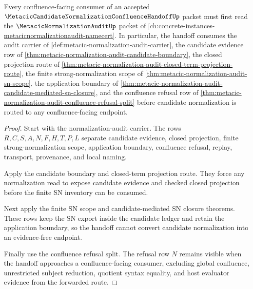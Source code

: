 \begin{theorem}
\label{thm:metacic-candidate-normalization-confluence-handoff-normalization-audit-forward-link}
Every confluence-facing consumer of an accepted $\MetacicCandidateNormalizationConfluenceHandoffUp$ packet must first read the $\MetacicNormalizationAuditUp$ packet of \autoref{ch:concrete-instances-metacicnormalizationaudit-namecert}. In particular, the handoff consumes the audit carrier of \autoref{def:metacic-normalization-audit-carrier}, the candidate evidence row of \autoref{thm:metacic-normalization-audit-candidate-boundary}, the closed projection route of \autoref{thm:metacic-normalization-audit-closed-term-projection-route}, the finite strong-normalization scope of \autoref{thm:metacic-normalization-audit-sn-scope}, the application boundary of \autoref{thm:metacic-normalization-audit-candidate-mediated-sn-closure}, and the confluence refusal row of \autoref{thm:metacic-normalization-audit-confluence-refusal-split} before candidate normalization is routed to any confluence-facing endpoint.
\end{theorem}
\begin{proof}
Start with the normalization-audit carrier. The rows $R,C,S,A,N,F,H,T,P,L$ separate candidate evidence, closed projection, finite strong-normalization scope, application boundary, confluence refusal, replay, transport, provenance, and local naming.

Apply the candidate boundary and closed-term projection route. They force any normalization read to expose candidate evidence and checked closed projection before the finite SN inventory can be consumed.

Next apply the finite SN scope and candidate-mediated SN closure theorems. These rows keep the SN export inside the candidate ledger and retain the application boundary, so the handoff cannot convert candidate normalization into an evidence-free endpoint.

Finally use the confluence refusal split. The refusal row $N$ remains visible when the handoff approaches a confluence-facing consumer, excluding global confluence, unrestricted subject reduction, quotient syntax equality, and host evaluator evidence from the forwarded route.
\end{proof}
